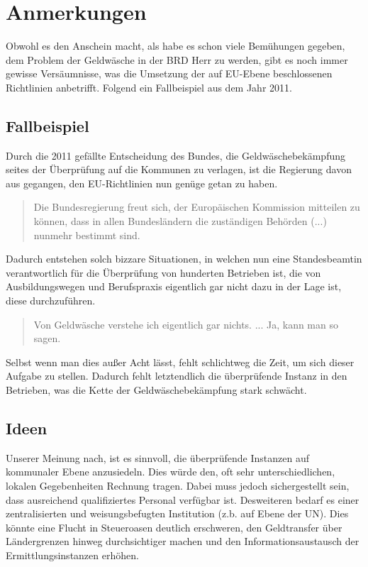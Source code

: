 \documentclass{article}
\begin{document}
\newpage

    \section[Anmerkungen]{Anmerkungen}

        Obwohl es den Anschein macht, als habe es schon viele Bemühungen gegeben, dem Problem der Geldwäsche in der BRD Herr zu werden, gibt es noch immer gewisse Versäumnisse, was die Umsetzung der auf EU-Ebene beschlossenen Richtlinien anbetrifft. Folgend ein Fallbeispiel aus dem Jahr 2011.

        \subsection[Fallbeispiel]{Fallbeispiel}

            Durch die 2011 gefällte Entscheidung des Bundes, die Geldwäschebekämpfung seites der Überprüfung auf die Kommunen zu verlagen, ist die Regierung davon aus gegangen, den EU-Richtlinien nun genüge getan zu haben.
            \begin{quote} Die Bundesregierung freut sich, der Europäischen Kommission mitteilen zu können, dass in allen Bundesländern die zuständigen Behörden (...) nunmehr bestimmt sind. \cite{EUZeugs} \end{quote}
            Dadurch entstehen solch bizzare Situationen, in welchen nun eine Standesbeamtin verantwortlich für die Überprüfung von hunderten Betrieben ist, die von Ausbildungswegen und Berufspraxis eigentlich gar nicht dazu in der Lage ist, diese durchzuführen. \begin{quote} Von Geldwäsche verstehe ich eigentlich gar nichts. ... Ja, kann man so sagen. \cite{Beatmin} \end{quote} Selbst wenn man dies außer Acht lässt, fehlt schlichtweg die Zeit, um sich dieser Aufgabe zu stellen. Dadurch fehlt letztendlich die überprüfende Instanz in den Betrieben, was die Kette der Geldwäschebekämpfung stark schwächt.

        \subsection[Ideen]{Ideen}

            Unserer Meinung nach, ist es sinnvoll, die überprüfende Instanzen auf kommunaler Ebene anzusiedeln. Dies würde den, oft sehr unterschiedlichen, lokalen Gegebenheiten Rechnung tragen. Dabei muss jedoch sichergestellt sein, dass ausreichend qualifiziertes Personal verfügbar ist.
            Desweiteren bedarf es einer zentralisierten und weisungsbefugten Institution (z.b. auf Ebene der UN). Dies könnte eine Flucht in Steueroasen deutlich erschweren, den Geldtransfer über Ländergrenzen hinweg durchsichtiger machen und den Informationsaustausch der Ermittlungsinstanzen erhöhen.
\end{document}
